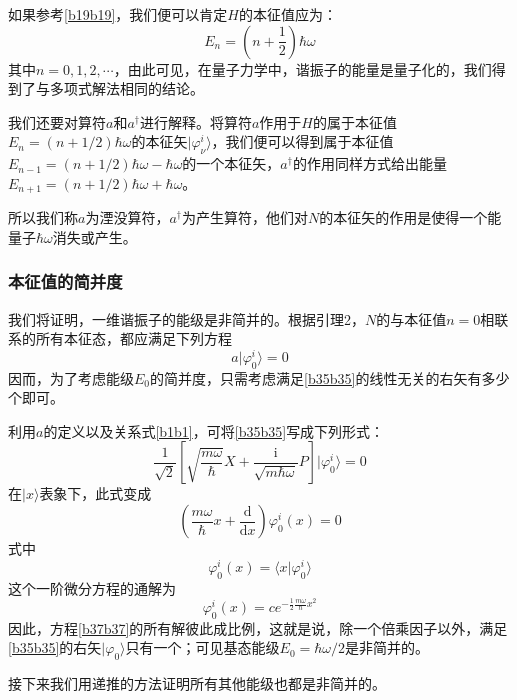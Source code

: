 \documentclass[]{article}
\begin{document}
如果参考\eqref{b19b19}，我们便可以肯定$H$的本征值应为：
\begin{equation}
	E_n=\left( n+\dfrac{1}{2}\right)\hbar\omega 
\end{equation}
其中$n=0,1,2,\cdots$，由此可见，在量子力学中，谐振子的能量是量子化的，我们得到了与多项式解法相同的结论。\par 
我们还要对算符$a$和$a^\dagger$进行解释。将算符$a$作用于$H$的属于本征值$E_n=(n+1/2)\hbar\omega$的本征矢$|\varphi_\nu^i\rangle$，我们便可以得到属于本征值$E_{n-1}=(n+1/2)\hbar\omega-\hbar\omega$的一个本征矢，$a^\dagger$的作用同样方式给出能量$E_{n+1}=(n+1/2)\hbar\omega+\hbar\omega$。\par 
所以我们称$a$为湮没算符，$a^\dagger$为产生算符，他们对$N$的本征矢的作用是使得一个能量子$\hbar\omega$消失或产生。
\subsubsection{本征值的简并度}
我们将证明，一维谐振子的能级是非简并的。根据引理2，$N$的与本征值$n=0$相联系的所有本征态，都应满足下列方程
\begin{equation}
	a|\varphi^i_0\rangle=0
	\label{b35b35}
\end{equation}
因而，为了考虑能级$E_0$的简并度，只需考虑满足\eqref{b35b35}的线性无关的右矢有多少个即可。\par 
利用$a$的定义以及关系式\eqref{b1b1}，可将\eqref{b35b35}写成下列形式：
\begin{equation}
	\dfrac{1}{\sqrt{2}}\left[ \sqrt{\dfrac{m\omega}{\hbar}}X+\dfrac{\mathrm{i}}{\sqrt{m\hbar\omega}}P\right] |\varphi^i_0\rangle=0
\end{equation}
在${|x\rangle}$表象下，此式变成
\begin{equation}
	\left( \dfrac{m\omega}{\hbar}x+\dfrac{\mathrm{d}}{\mathrm{d}x}\right) \varphi^i_0(x)=0
	\label{b37b37}
\end{equation}
式中
\begin{equation}
	\varphi^i_0(x)=\langle x|\varphi^i_0\rangle
\end{equation}
这个一阶微分方程的通解为
\begin{equation}
	\varphi^i_0(x)=ce^{-\frac{1}{2}\frac{m\omega}{\hbar}x^2}
\end{equation}
因此，方程\eqref{b37b37}的所有解彼此成比例，这就是说，除一个倍乘因子以外，满足\eqref{b35b35}的右矢$|\varphi_0\rangle$只有一个；可见基态能级$E_0=\hbar\omega/2$是非简并的。\par 
接下来我们用递推的方法证明所有其他能级也都是非简并的。\par 
\end{document}
